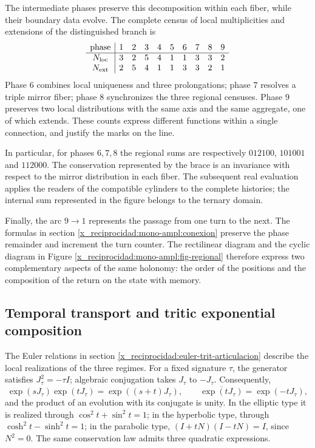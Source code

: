 The intermediate phases preserve this decomposition within each fiber,
while their boundary data evolve. The complete census of
local multiplicities and extensions of the distinguished branch is
\[
\begin{array}{c|rrrrrrrrr}
\text{phase}&1&2&3&4&5&6&7&8&9\\\hline
N_{\rm loc}&3&2&5&4&1&1&3&3&2\\
N_{\rm ext}&2&5&4&1&1&3&3&2&1
\end{array}
\]
Phase \(6\) combines local uniqueness and three prolongations; phase
\(7\) resolves a triple mirror fiber; phase \(8\) synchronizes
the three regional censuses. Phase \(9\) preserves two local
distributions with the same axis and the same aggregate, one of which
extends. These counts express different functions within a
single connection, and justify the marks on the line.

In particular, for phases \(6,7,8\) the regional sums are
respectively \(012100\), \(101001\) and \(112000\). The conservation
represented by the brace is an invariance with respect to the mirror
distribution in each fiber. The subsequent real evaluation applies the
readers of the compatible cylinders to the complete histories; the
internal sum represented in the figure belongs to the ternary domain.

Finally, the arc \(9\to1\) represents the passage from one turn to the
next. The formulas in section
\ref{x_reciprocidad:mono-ampl:conexion} preserve the phase remainder and increment the
turn counter. The rectilinear diagram and the cyclic diagram in
Figure \ref{x_reciprocidad:mono-ampl:fig-regional} therefore express two complementary
aspects of the same holonomy: the order of the positions and the
composition of the return on the state with memory.



\subsection{Temporal transport and tritic exponential composition}
\label{x_reciprocidad:mono-ampl:euler}

The Euler relations in section \ref{x_reciprocidad:euler-trit-articulacion}
describe the local realizations of the three regimes. For a fixed
signature \(\tau\), the generator satisfies \(J_\tau^2=-\tau I\); algebraic
conjugation takes \(J_\tau\) to \(-J_\tau\). Consequently,
\[
 \exp(sJ_\tau)\exp(tJ_\tau)=\exp((s+t)J_\tau),\qquad
 \overline{\exp(tJ_\tau)}=\exp(-tJ_\tau),
\]
and the product of an evolution with its conjugate is unity. In the elliptic
type it is realized through \(\cos^2t+\sin^2t=1\); in the hyperbolic type,
through \(\cosh^2t-\sinh^2t=1\); in the parabolic type,
\((I+tN)(I-tN)=I\), since \(N^2=0\). The same conservation law
admits three quadratic expressions.

